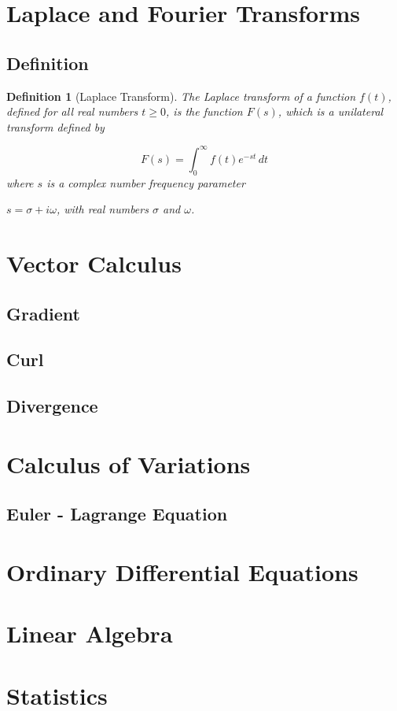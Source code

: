 \documentclass[12pt]{article}
\newtheorem{defn}{Definition}
\begin{document}
\section{Laplace and Fourier Transforms}
\subsection{Definition}
\begin{defn}[Laplace Transform]
The Laplace transform of a function $f(t)$, defined for all real numbers $t \geq 0$, is the function $F(s)$, which is a unilateral transform defined by

$${\displaystyle F(s)=\int _{0}^{\infty }f(t)e^{-st}\,dt}$$
where $s$ is a complex number frequency parameter

${\displaystyle s=\sigma +i\omega }$, with real numbers $\sigma$ and $\omega$.
\end{defn}
\section{Vector Calculus}
\subsection{Gradient}
\subsection{Curl}
\subsection{Divergence}
\section{Calculus of Variations}
\subsection{Euler - Lagrange Equation}
\section{Ordinary Differential Equations}
\section{Linear Algebra}
\section{Statistics}
\end{document}
